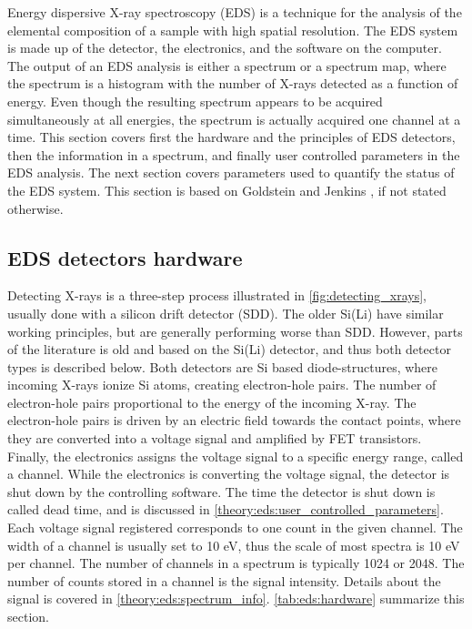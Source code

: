 Energy dispersive X-ray spectroscopy (EDS) is a technique for the analysis of the elemental composition of a sample with high spatial resolution.
The EDS system is made up of the detector, the electronics, and the software on the computer.
The output of an EDS analysis is either a spectrum or a spectrum map, where the spectrum is a histogram with the number of X-rays detected as a function of energy.
Even though the resulting spectrum appears to be acquired simultaneously at all energies, the spectrum is actually acquired one channel at a time.
This section covers first the hardware and the principles of EDS detectors, then the information in a spectrum, and finally user controlled parameters in the EDS analysis.
The next section covers parameters used to quantify the status of the EDS system. %
This section is based on Goldstein \cite{goldstein_scanning_2018} and Jenkins \cite{jenkins_xrayspectroscopy}, if not stated otherwise.




\subsection{EDS detectors hardware}
\label{theory:eds:hardware}


Detecting X-rays is a three-step process illustrated in \cref{fig:detecting_xrays}, usually done with a silicon drift detector (SDD).
The older Si(Li) have similar working principles, but are generally performing worse than SDD.
However, parts of the literature is old and based on the Si(Li) detector, and thus both detector types is described below.
Both detectors are Si based diode-structures, where incoming X-rays ionize Si atoms, creating electron-hole pairs.
The number of electron-hole pairs proportional to the energy of the incoming X-ray.
The electron-hole pairs is driven by an electric field towards the contact points, where they are converted into a voltage signal and amplified by FET transistors.
Finally, the electronics assigns the voltage signal to a specific energy range, called a channel.
While the electronics is converting the voltage signal, the detector is shut down by the controlling software.
The time the detector is shut down is called dead time, and is discussed in \cref{theory:eds:user_controlled_parameters}.
Each voltage signal registered corresponds to one count in the given channel.
The width of a channel is usually set to 10 eV, thus the scale of most spectra is 10 eV per channel.
The number of channels in a spectrum is typically 1024 or 2048.
The number of counts stored in a channel is the signal intensity.
Details about the signal is covered in \cref{theory:eds:spectrum_info}.
\cref{tab:eds:hardware} summarize this section.


